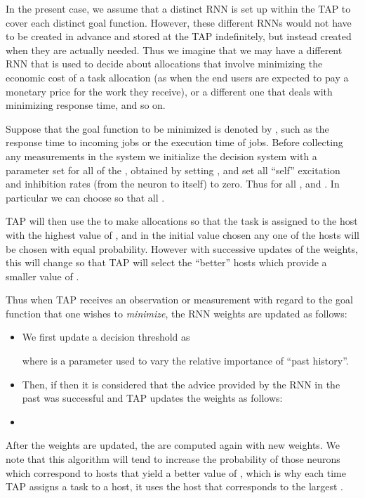 \documentclass[journal]{IEEEtran}
\begin{document}
In the present case, we assume that a distinct RNN is set up within the TAP to cover each distinct goal function. However, these
different RNNs would not have to be created in advance and stored at the TAP indefinitely, but instead created when they are actually needed. Thus we imagine that
we may have a different RNN that is used to decide about allocations that involve minimizing the economic cost of a task allocation (as when the end users are expected to pay a monetary price for the work they receive),
or a different one that deals with minimizing response time, and so on. 

Suppose that the goal function to be minimized is denoted by , such as the response time 
to incoming jobs or the execution time of jobs. Before collecting any measurements in the system we initialize the 
decision system with a parameter set   for all of the , obtained by setting
, and set all ``self'' excitation and inhibition rates (from the neuron to itself)
to zero. Thus  for all , and . In particular we can choose  so that all .

TAP will then use the  to make allocations so that the task is assigned to the host with the highest value of , and in the initial value chosen
any one of the hosts will be chosen with equal probability.
However with successive updates of the weights, this will change so that TAP will select the ``better'' hosts which provide a smaller value of . 

Thus when TAP receives an observation or measurement  with regard to the goal function that one wishes to {\em minimize}, the RNN weights are updated as follows: 
\begin{itemize}
\item We first update a decision threshold  as

where  is a parameter used to vary the relative importance of ``past history''.
\item Then, if  then it is considered that the advice provided by the RNN in the past was successful and
TAP updates the weights as follows:

\item 

\end{itemize}
After the weights are updated, the  are computed again with new weights.
We note that this algorithm will tend to increase the probability  of those neurons which correspond to hosts that yield a better value of
, which is why each time TAP assigns a task to a host, it uses the host  that corresponds to the largest .
\end{document}
